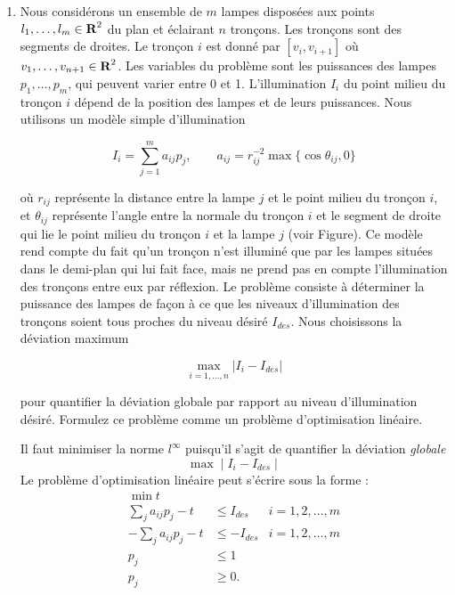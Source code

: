\begin{enumerate}
  \item Nous considérons un ensemble de $m$ lampes disposées aux points $l_1, \ldots, l_m \in {\mbox{\bf R}}^2$ du plan et éclairant $n$
    tronçons. Les tronçons sont des segments de droites. Le tronçon $i$ est donné par $[v_i, v_{i+1}]$ où $v_1, \ldots, v_{n+1}
    \in {\mbox{\bf R}}^2$.  Les variables du problème sont les puissances des lampes $p_1, \ldots, p_m$, qui peuvent varier entre 0 et 1.
    L'illumination $I_i$ du point milieu du tronçon $i$ dépend de la position des lampes et de leurs
    puissances. Nous utilisons un modèle simple d'illumination

    $$I_i = \sum_{j=1}^m a_{ij} p_j, \qquad a_{ij}=r_{ij}^{-2} \max \{\cos \theta_{ij}, 0 \}$$

    où $r_{ij}$ représente la distance entre la lampe $j$ et le point milieu du tronçon $i$, et $\theta_{ij}$ représente l'angle
    entre la normale du tronçon $i$ et le segment de droite qui lie le point milieu du tronçon $i$ et la lampe $j$ (voir Figure). Ce
    modèle rend compte du fait qu'un tronçon n'est illuminé que par les lampes situées dans le demi-plan qui lui fait face,
    mais ne prend pas en compte l'illumination des tronçons entre eux par réflexion.  Le problème consiste à déterminer la puissance des lampes de façon à ce
    que les niveaux d'illumination des  tronçons soient tous proches du niveau désiré $I_{des}$. Nous choisissons la déviation maximum

    $$\max_{i=1, \ldots, n} | I_i -I_{des}|$$

    pour quantifier la déviation globale par rapport au niveau d'illumination désiré. Formulez ce problème comme un problème d'optimisation linéaire.

    \begin{solution}
      Il faut minimiser la norme $l^{\infty}$ puisqu'il s'agit de quantifier la déviation \textit{globale} 
      $$ \max \mid I_{i} - I_{des} \mid $$ 
      Le problème d'optimisation linéaire peut s'écrire sous la forme : 
      \begin{align*}
        \min t\\
        \sum_{j}a_{ij}p_{j} - t & \leq I_{des} & i = 1, 2, \dots, m\\
        -\sum_{j}a_{ij}p_{j} - t & \leq -I_{des} & i = 1, 2, \dots, m\\
        p_j & \leq 1\\
        p_j & \geq 0.
      \end{align*}
    \end{solution}




\end{enumerate}
